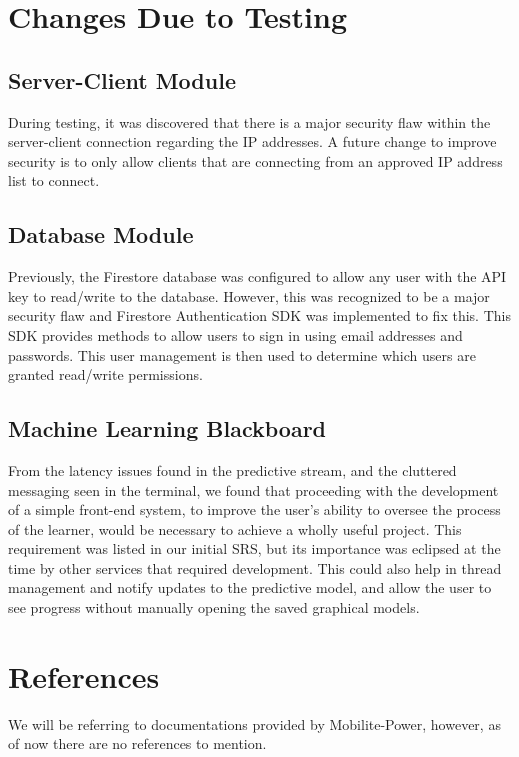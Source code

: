 \documentclass[12pt, titlepage]{article}
\begin{document}
\section{Changes Due to Testing}
\subsection{Server-Client Module}
During testing, it was discovered that there is a major security flaw within the server-client connection regarding the IP addresses. A future change to improve security is to only allow clients that are connecting from an approved IP address list to connect.

\subsection{Database Module}
Previously, the Firestore database was configured to allow any user with the API key to read/write to the database. However, this was recognized to be a major security flaw and Firestore Authentication SDK was implemented to fix this. This SDK provides methods to allow users to sign in using email addresses and passwords. This user management is then used to determine which users are granted read/write permissions.

\subsection{Machine Learning Blackboard}
From the latency issues found in the predictive stream, and the cluttered messaging seen in the terminal, we found that proceeding with the development of a simple front-end system, to improve the user's ability to oversee the process of the learner, would be necessary to achieve a wholly useful project. This requirement was listed in our initial SRS, but its importance was eclipsed at the time by other services that required development. This could also help in thread management and notify updates to the predictive model, and allow the user to see progress without manually opening the saved graphical models.



\section*{References}
We will be referring to documentations provided by Mobilite-Power, however, as of now there are no references to mention.
\end{document}
